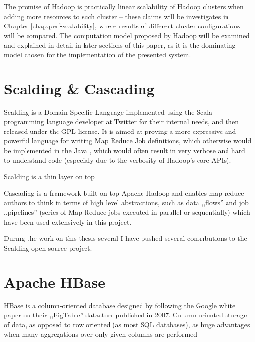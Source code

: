 The promise of Hadoop is practically linear scalability of Hadoop clusters when adding more resources to such cluster -- these claims will be investigates in Chapter \ref{chap:perf-scalability}, where results of different cluster configurations will be compared. The computation model proposed by Hadoop will be examined and explained in detail in later sections of this paper, as it is the dominating model chosen for the implementation of the presented system.

\section{Scalding \& Cascading}
\label{sec:scalding-info}

Scalding is a Domain Specific Language implemented using the Scala \cite{scala} programming language developer at Twitter \cite{twitter} for their internal needs, and then released under the GPL license. It is aimed at proving a more expressive and powerful language for writing Map Reduce Job definitions, which otherwise
would be implemented in the Java \cite{java}, which would often result in very verbose and hard to understand code (especialy due to the verbosity of Hadoop's core APIs).

Scalding is a thin layer on top

Cascading is a framework built on top Apache Hadoop and enables map reduce authors to think in terms of high level abstractions, such as data ,,flows'' 
and job ,,pipelines'' (series of Map Reduce jobs executed in parallel or sequentially) which have been used extensively in this project.

During the work on this thesis several I have pushed several contributions to the Scalding open source project.


\section{Apache HBase}
\label{sec:hbase}

HBase is a column-oriented database \cite{columnar-database} designed by following the Google white paper on their ,,BigTable'' datastore published in 2007.
Column oriented storage of data, as opposed to row oriented (as most SQL databases), as huge advantages when many aggregations over only given columns are performed.

